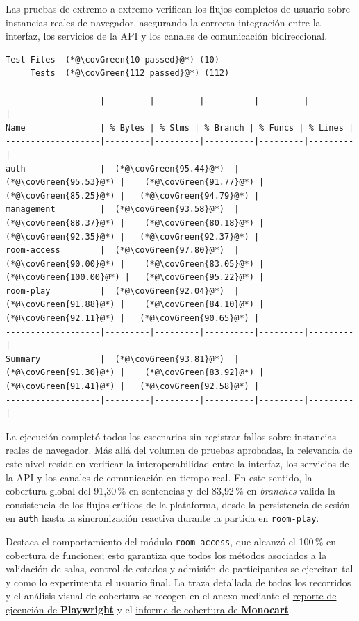 Las pruebas de extremo a extremo verifican los flujos completos de usuario sobre instancias reales de navegador, asegurando la correcta integración entre la interfaz, los servicios de la API y los canales de comunicación bidireccional. 
\begin{evidence}[H]
\begin{lstlisting}
Test Files  (*@\covGreen{10 passed}@*) (10)
     Tests  (*@\covGreen{112 passed}@*) (112)

-------------------|---------|---------|----------|---------|---------|
Name               | % Bytes | % Stms | % Branch | % Funcs | % Lines |
-------------------|---------|---------|----------|---------|---------|
auth               |  (*@\covGreen{95.44}@*)  |   (*@\covGreen{95.53}@*) |    (*@\covGreen{91.77}@*) |   (*@\covGreen{85.25}@*) |   (*@\covGreen{94.79}@*) |
management         |  (*@\covGreen{93.58}@*)  |   (*@\covGreen{88.37}@*) |    (*@\covGreen{80.18}@*) |   (*@\covGreen{92.35}@*) |   (*@\covGreen{92.37}@*) |
room-access        |  (*@\covGreen{97.80}@*)  |   (*@\covGreen{90.00}@*) |    (*@\covGreen{83.05}@*) |  (*@\covGreen{100.00}@*) |   (*@\covGreen{95.22}@*) |
room-play          |  (*@\covGreen{92.04}@*)  |   (*@\covGreen{91.88}@*) |    (*@\covGreen{84.10}@*) |   (*@\covGreen{92.11}@*) |   (*@\covGreen{90.65}@*) |
-------------------|---------|---------|----------|---------|---------|
Summary            |  (*@\covGreen{93.81}@*)  |   (*@\covGreen{91.30}@*) |    (*@\covGreen{83.92}@*) |   (*@\covGreen{91.41}@*) |   (*@\covGreen{92.58}@*) |
-------------------|---------|---------|----------|---------|---------|
\end{lstlisting}
\caption{Resumen de pruebas y cobertura \textit{End-to-End}.}
\label{ev:resumen_e2e}
\end{evidence}

La ejecución completó todos los escenarios sin registrar fallos sobre instancias reales de navegador. Más allá del volumen de pruebas aprobadas, la relevancia de este nivel reside en verificar la interoperabilidad entre la interfaz, los servicios de la API y los canales de comunicación en tiempo real. En este sentido, la cobertura global del 91{,}30\,\% en sentencias y del 83{,}92\,\% en \textit{branches} valida la consistencia de los flujos críticos de la plataforma, desde la persistencia de sesión en \texttt{auth} hasta la sincronización reactiva durante la partida en \texttt{room-play}.

Destaca el comportamiento del módulo \texttt{room-access}, que alcanzó el 100\,\% en cobertura de funciones; esto garantiza que todos los métodos asociados a la validación de salas, control de estados y admisión de participantes se ejercitan tal y como lo experimenta el usuario final. La traza detallada de todos los recorridos y el análisis visual de cobertura se recogen en el anexo mediante el \hyperref[ev:reporte_playwright]{reporte de ejecución de \textbf{Playwright}} y el \hyperref[ev:cobertura_e2e]{informe de cobertura de \textbf{Monocart}}.

